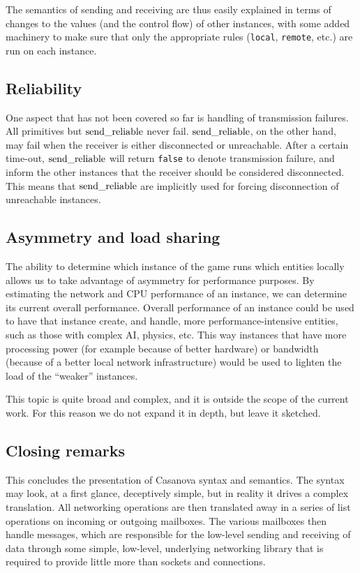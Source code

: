 The semantics of sending and receiving are thus easily explained in terms of changes to the values (and the control flow) of other instances, with some added machinery to make sure that only the appropriate rules (\texttt{local}, \texttt{remote}, etc.) are run on each instance.

\subsection{Reliability}
One aspect that has not been covered so far is handling of transmission failures. All primitives but $\operatorname{send\_reliable}$ never fail. $\operatorname{send\_reliable}$, on the other hand, may fail when the receiver is either disconnected or unreachable. After a certain time-out, $\operatorname{send\_reliable}$ will return \texttt{false} to denote transmission failure, and inform the other instances that the receiver should be considered disconnected. This means that $\operatorname{send\_reliable}$ are implicitly used for forcing disconnection of unreachable instances.

\subsection{Asymmetry and load sharing}
The ability to determine which instance of the game runs which entities locally allows us to take advantage of asymmetry for performance purposes. By estimating the network and CPU performance of an instance, we can determine its current overall performance. Overall performance of an instance could be used to have that instance create, and handle, more performance-intensive entities, such as those with complex AI, physics, etc. This way instances that have more processing power (for example because of better hardware) or bandwidth (because of a better local network infrastructure) would be used to lighten the load of the ``weaker'' instances.

This topic is quite broad and complex, and it is outside the scope of the current work. For this reason we do not expand it in depth, but leave it sketched.

\subsection{Closing remarks}
This concludes the presentation of Casanova syntax and semantics. The syntax may look, at a first glance, deceptively simple, but in reality it drives a complex translation. All networking operations are then translated away in a series of list operations on incoming or outgoing mailboxes. The various mailboxes then handle messages, which are responsible for the low-level sending and receiving of data through some simple, low-level, underlying networking library that is required to provide little more than sockets and connections.
